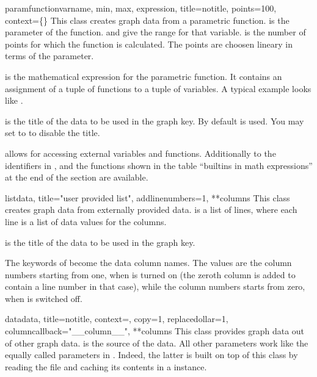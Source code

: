 \begin{classdesc}{paramfunction}{varname, min, max, expression, %
                                 title=notitle, points=100,
                                 context=\{\}}
  This class creates graph data from a parametric function.
   is the parameter of the function.  and
   give the range for that variable.  is the
  number of points for which the function is calculated. The points
  are choosen lineary in terms of the parameter.

   is the mathematical expression for the parametric
  function. It contains an assignment of a tuple of functions to a
  tuple of variables. A typical example looks like
  .

   is the title of the data to be used in the graph key. By
  default  is used. You may set  to
   to disable the title.

   allows for accessing external variables and functions.
  Additionally to the identifiers in ,  and
  the functions shown in the table ``builtins in math expressions'' at
  the end of the section are available.
\end{classdesc} %

\begin{classdesc}{list}{data, title="user provided list", %
                        addlinenumbers=1, **columns}
  This class creates graph data from externally provided data.
   is a list of lines, where each line is a list of data
  values for the columns.

   is the title of the data to be used in the graph key.

  The keywords of  become the data column names. The
  values are the column numbers starting from one, when
   is turned on (the zeroth column is added to
  contain a line number in that case), while the column numbers starts
  from zero, when  is switched off.
\end{classdesc} %

\begin{classdesc}{data}{data, title=notitle, context={}, copy=1, %
                        replacedollar=1, columncallback="\_\_column\_\_", **columns}
  This class provides graph data out of other graph data. 
  is the source of the data. All other parameters work like the equally
  called parameters in . Indeed, the latter is
  built on top of this class by reading the file and caching its
  contents in a  instance.
\end{classdesc} %

